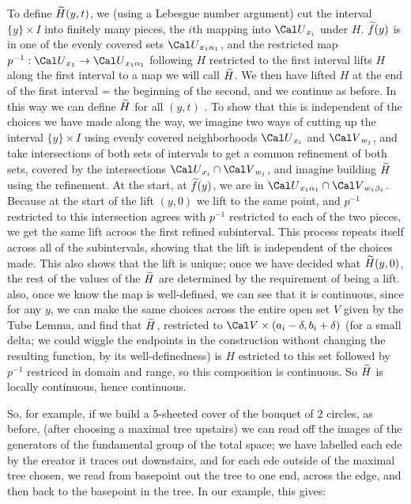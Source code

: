 To define $\widetilde{H}(y,t)$, we (using a Lebesgue number argument) cut the
interval $\{y\}\times I$ into finitely many pieces, the $i$th mapping into 
 ${\Cal U}_{x_i}$ under $H$. $\widetilde{f}(y)$ is in one of the evenly covered
sets ${\Cal U}_{x_1\alpha_1}$, and the restricted map 
$p^{-1}:{\Cal U}_{x_1}\ra {\Cal U}_{x_1\alpha_1}$ following $H$ restricted
to the first interval lifts $H$ along the first interval to a map 
we will call $\widetilde{H}$. We then have 
lifted $H$ at the end of the first interval = the beginning of the second, 
and we continue as before. In this way we can define $\widetilde{H}$ for all
$(y,t)$ . To show that this is independent of the choices we have
made along the way, we imagine two ways of cutting up the interval 
$\{y\}\times I$ using evenly covered neighborhoods ${\Cal U}_{x_i}$
and ${\Cal V}_{w_j}$, and take intersections of both sets of intervals
to get a common refinement of both sets, covered by the intersections
${\Cal U}_{x_i}\cap {\Cal V}_{w_j}$, and imagine building $\widetilde{H}$ using
the refinement. At the start, at $\widetilde{f}(y)$, we are in 
${\Cal U}_{x_1\alpha_1}\cap {\Cal V}_{w_1\beta_1}$. Because at the 
start of the lift $(y,0)$ we lift to the same point, and $p^{-1}$ restricted 
to this intersection agrees with $p^{-1}$ restricted to each of the two
pieces, we get the same lift acroos the first refined subinterval. This
process repeats itself across all of the subintervals, showing that
the lift is independent of the choices made. This also shows that
the lift is unique; once we have decided what $\widetilde{H}(y,0)$, the
rest of the values of the $\widetilde{H}$ are determined by the requirement
of being a lift. also, once we know the map is well-defined, we can see
that it is continuous, since for any $y$, we can make the same choices
across the entire open set $V$ given by the Tube Lemma, and find
that $\widetilde{H}$, restricted to ${\Cal V}\times(a_i-\delta,b_i+\delta)$
(for a small delta; we could wiggle the endpoints in the construction
without changing the resulting function, by its well-definedness)
is $H$ estricted to this set followed by $p^{-1}$ restriced in domain 
and range, so this composition is continuous. So $\widetilde{H}$
is locally continuous, hence continuous.

\msk

So, for example, if we build a 5-sheeted cover of the bouquet of 2 circles, 
as before, (after choosing a maximal tree upstairs) 
we can read off the images of the generators of the fundamental group
of the total space; we have labelled each ede by the ereator it
traces out downstairs, and for each ede outside of the maximal tree
chosen, we read from basepoint out the tree to one end, across the edge,
and then back to the basepoint in the tree. In our example, this
gives:


